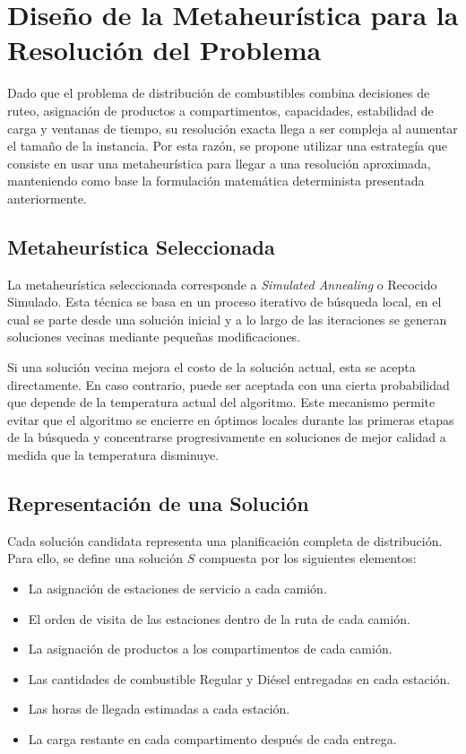 \section{Diseño de la Metaheurística para la Resolución del Problema}

Dado que el problema de distribución de combustibles combina decisiones de ruteo, asignación de productos a compartimentos, capacidades, estabilidad de carga y ventanas de tiempo, su resolución exacta llega a ser compleja al aumentar el tamaño de la instancia. Por esta razón, se propone utilizar una estrategía que consiste en usar una metaheurística para llegar a una resolución aproximada, manteniendo como base la formulación matemática determinista presentada anteriormente.


\subsection{Metaheurística Seleccionada}

La metaheurística seleccionada corresponde a \textit{Simulated Annealing} o Recocido Simulado. Esta técnica se basa en un proceso iterativo de búsqueda local, en el cual se parte desde una solución inicial y a lo largo de las iteraciones se generan soluciones vecinas mediante pequeñas modificaciones. 

Si una solución vecina mejora el costo de la solución actual, esta se acepta directamente. En caso contrario, puede ser aceptada con una cierta probabilidad que depende de la temperatura actual del algoritmo. Este mecanismo permite evitar que el algoritmo se encierre en óptimos locales durante las primeras etapas de la búsqueda y concentrarse progresivamente en soluciones de mejor calidad a medida que la temperatura disminuye.

\subsection{Representación de una Solución}

Cada solución candidata representa una planificación completa de distribución. Para ello, se define una solución $S$ compuesta por los siguientes elementos:

\begin{itemize}
    \item La asignación de estaciones de servicio a cada camión.
    \item El orden de visita de las estaciones dentro de la ruta de cada camión.
    \item La asignación de productos a los compartimentos de cada camión.
    \item Las cantidades de combustible Regular y Diésel entregadas en cada estación.
    \item Las horas de llegada estimadas a cada estación.
    \item La carga restante en cada compartimento después de cada entrega.
\end{itemize}

